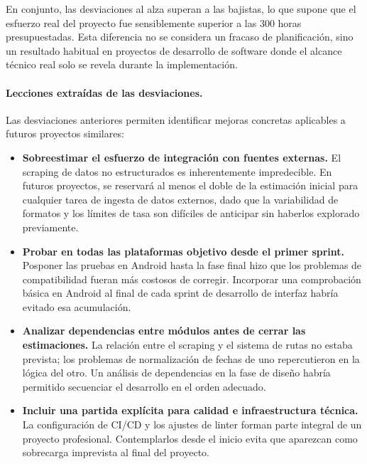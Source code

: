 En conjunto, las desviaciones al alza superan a las bajistas, lo que supone que el esfuerzo real del proyecto fue sensiblemente superior a las 300 horas presupuestadas. Esta diferencia no se considera un fracaso de planificación, sino un resultado habitual en proyectos de desarrollo de software donde el alcance técnico real solo se revela durante la implementación.

\paragraph{Lecciones extraídas de las desviaciones.}

Las desviaciones anteriores permiten identificar mejoras concretas aplicables a futuros proyectos similares:

\begin{itemize}
    \item \textbf{Sobreestimar el esfuerzo de integración con fuentes externas.} El scraping de datos no estructurados es inherentemente impredecible. En futuros proyectos, se reservará al menos el doble de la estimación inicial para cualquier tarea de ingesta de datos externos, dado que la variabilidad de formatos y los límites de tasa son difíciles de anticipar sin haberlos explorado previamente.

    \item \textbf{Probar en todas las plataformas objetivo desde el primer sprint.} Posponer las pruebas en Android hasta la fase final hizo que los problemas de compatibilidad fueran más costosos de corregir. Incorporar una comprobación básica en Android al final de cada sprint de desarrollo de interfaz habría evitado esa acumulación.

    \item \textbf{Analizar dependencias entre módulos antes de cerrar las estimaciones.} La relación entre el scraping y el sistema de rutas no estaba prevista; los problemas de normalización de fechas de uno repercutieron en la lógica del otro. Un análisis de dependencias en la fase de diseño habría permitido secuenciar el desarrollo en el orden adecuado.

    \item \textbf{Incluir una partida explícita para calidad e infraestructura técnica.} La configuración de CI/CD y los ajustes de linter forman parte integral de un proyecto profesional. Contemplarlos desde el inicio evita que aparezcan como sobrecarga imprevista al final del proyecto.
\end{itemize}

